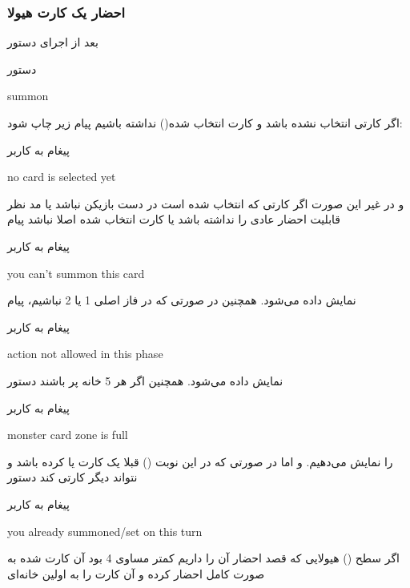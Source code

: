 \documentclass[]{article}
\begin{document}
\subsubsection*{{\titr احضار یک کارت هیولا}}
    بعد از اجرای دستور
\begin{mybox}[colback=yellow]{دستور}
	\begin{latin}	
		summon 
	\end{latin}
\end{mybox}
اگر کارتی انتخاب نشده باشد و کارت انتخاب شده() نداشته باشیم 
پیام زیر چاپ شود:
\begin{mybox}[colback=yellow]{پیغام به کاربر}
	\begin{latin}	
		no card is selected yet
	\end{latin}
\end{mybox}
و در غیر این صورت اگر کارتی که انتخاب شده است در دست بازیکن نباشد یا 
 مد نظر قابلیت احضار عادی را نداشته باشد یا کارت انتخاب شده 
اصلا 
 نباشد پیام
\begin{mybox}[colback=yellow]{پیغام به کاربر}
	\begin{latin}	
		you can’t summon this card
	\end{latin}
\end{mybox}
نمایش داده می‌شود. همچنین  در صورتی که در فاز اصلی 1 یا 2 نباشیم، پیام
\begin{mybox}[colback=yellow]{پیغام به کاربر}
	\begin{latin}	
		action not allowed in this phase
	\end{latin}
\end{mybox}
نمایش داده می‌شود. همچنین اگر هر 5 خانه  پر باشند دستور
\begin{mybox}[colback=yellow]{پیغام به کاربر}
	\begin{latin}	
		monster card zone is full
	\end{latin}
\end{mybox}
را نمایش می‌دهیم. و اما در صورتی که در این نوبت () قبلا یک کارت  
 یا  کرده باشد و نتواند دیگر کارتی  کند دستور
\begin{mybox}[colback=yellow]{پیغام به کاربر}
	\begin{latin}	
		you already summoned/set on this turn
	\end{latin}
\end{mybox}
اگر سطح () هیولایی که قصد احضار آن را داریم کمتر مساوی 4 بود آن 
کارت  شده به صورت کامل احضار کرده و آن کارت را به اولین خانه‌ای 
\end{document}

